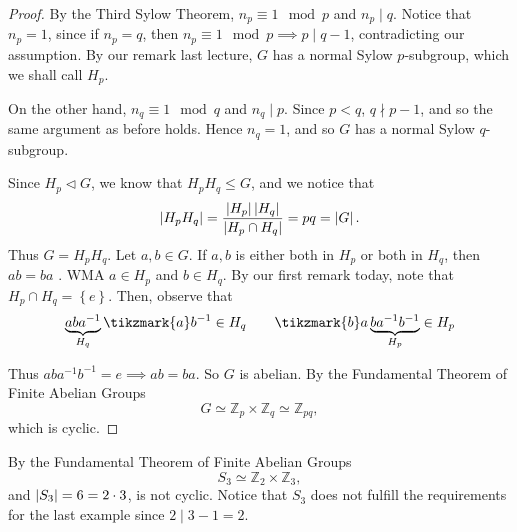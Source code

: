 \documentclass[notoc,notitlepage]{tufte-book}
\begin{document}
\begin{proof}
  By the Third Sylow Theorem, $n_p \equiv 1 \mod p$ and $n_p \mid q$. Notice that $n_p = 1$,
  since if $n_p = q$, then $n_p \equiv 1 \mod p \implies p \mid q - 1$, contradicting our
  assumption. By our remark last lecture, $G$ has a normal Sylow $p$-subgroup, which we shall
  call $H_p$.

  On the other hand, $n_q \equiv 1 \mod q$ and $n_q \mid p$. Since $p < q$, $q \nmid p - 1$,
  and so the same argument as before holds. Hence $n_q = 1$, and so $G$ has a normal Sylow
  $q$-subgroup.

  Since $H_p \triangleleft G$, we know that $H_p H_q \leq G$, and we notice that
  \begin{equation*}
    \left| H_p H_q \right| = \frac{\left| H_p \right| \left| H_q \right|}{\left| H_p \cap H_q \right|} = pq = \left| G \right|.
  \end{equation*}
  Thus $G = H_p H_q$. Let $a, b \in G$. If $a, b$ is either both in $H_p$ or both in $H_q$,
  then $ab = ba$ .
  WMA $a \in H_p$ and $b \in H_q$. By our first remark today, note that 
  $H_p \cap H_q = \left\{ e \right\}$. Then, observe that
  \begin{equation*}
    \underbrace{aba^{-1}}_{H_q} \tikzmark{a}b^{-1} \in H_q 
    \qquad \tikzmark{b}a \underbrace{ba^{-1}b^{-1}}_{H_p} \in H_p
  \end{equation*}
  Thus $aba^{-1}b^{-1} = e \implies ab = ba$. So $G$ is abelian. By the
  Fundamental Theorem of Finite Abelian Groups
  \begin{equation*}
    G \simeq \mathbb{Z}_p \times \mathbb{Z}_q \simeq \mathbb{Z}_{pq},
  \end{equation*}
  which is cyclic.
\end{proof}

\begin{eg}
  By the Fundamental Theorem of Finite Abelian Groups
  \begin{equation*}
    S_3 \simeq \mathbb{Z}_2 \times \mathbb{Z}_3,
  \end{equation*}
  and $\left| S_3 \right| = 6 = 2 \cdot 3$, is not cyclic. Notice that $S_3$ does not
  fulfill the requirements for the last example since $2 \mid 3 - 1 = 2$.
\end{eg}
\end{document}

